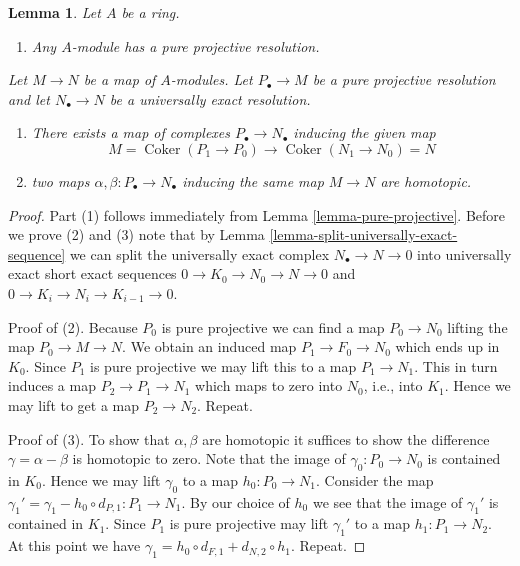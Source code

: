 \documentclass{stacks-project}
\theoremstyle{plain}
\newtheorem{lemma}[subsection]{Lemma}
\theoremstyle{definition}
\theoremstyle{remark}
\numberwithin{equation}{subsection}
\def\Coker{\mathop{\mathrm{Coker}}}
\begin{document}
\begin{lemma}
\label{lemma-pure-projective-resolutions}
Let $A$ be a ring.
\begin{enumerate}
\item Any $A$-module has a pure projective resolution.
\end{enumerate}
Let $M \to N$ be a map of $A$-modules.
Let $P_\bullet \to M$ be a pure projective resolution and
let $N_\bullet \to N$ be a universally exact resolution.
\begin{enumerate}
\item[(2)] There exists a map of complexes $P_\bullet \to N_\bullet$
inducing the given map
$$
M = \Coker(P_1 \to P_0) \to \Coker(N_1 \to N_0) = N
$$
\item[(3)] two maps $\alpha, \beta : P_\bullet \to N_\bullet$
inducing the same map $M \to N$ are homotopic.
\end{enumerate}
\end{lemma}

\begin{proof}
Part (1) follows immediately from
Lemma \ref{lemma-pure-projective}.
Before we prove (2) and (3) note that by
Lemma \ref{lemma-split-universally-exact-sequence}
we can split the universally exact complex $N_\bullet \to N \to 0$
into universally exact short exact sequences $0 \to K_0 \to N_0 \to N \to 0$
and $0 \to K_i \to N_i \to K_{i - 1} \to 0$.

\medskip\noindent
Proof of (2). Because $P_0$ is pure projective
we can find a map $P_0 \to N_0$ lifting the map $P_0 \to M \to N$.
We obtain an induced map $P_1 \to F_0 \to N_0$ which ends up in $K_0$.
Since $P_1$ is pure projective we may lift this
to a map $P_1 \to N_1$. This in turn induces a map
$P_2 \to P_1 \to N_1$ which maps to zero into
$N_0$, i.e., into $K_1$. Hence we may lift to get a map
$P_2 \to N_2$. Repeat.

\medskip\noindent
Proof of (3). To show that $\alpha, \beta$ are homotopic it suffices
to show the difference $\gamma = \alpha - \beta$ is homotopic
to zero. Note that the image of $\gamma_0 : P_0 \to N_0$
is contained in $K_0$. Hence we may lift
$\gamma_0$ to a map $h_0 : P_0 \to N_1$. Consider the map
$\gamma_1' = \gamma_1 - h_0 \circ d_{P, 1} : P_1 \to N_1$.
By our choice of $h_0$ we see that the image of $\gamma_1'$
is contained in $K_1$. Since $P_1$ is pure projective may lift
$\gamma_1'$ to a map $h_1 : P_1 \to N_2$. At this point we have
$\gamma_1 = h_0 \circ d_{F, 1} + d_{N, 2} \circ h_1$. Repeat.
\end{proof}
\end{document}

